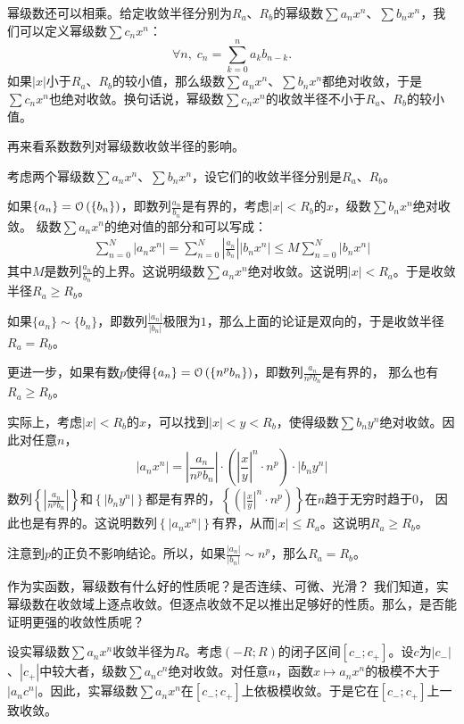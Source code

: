 \documentclass[12pt,UTF8,fontset=none]{ctexbook}
\begin{document}
\begin{appendix}
幂级数还可以相乘。给定收敛半径分别为$R_a$、$R_b$的幂级数$\sum a_n x^n$、$\sum b_n x^n$，我们可以定义幂级数$\sum c_n x^n$：
$$ \forall n, \; c_n = \sum_{k=0}^n a_k b_{n-k}.$$
如果$|x|$小于$R_a$、$R_b$的较小值，那么级数$\sum a_n x^n$、$\sum b_n x^n$都绝对收敛，于是$\sum c_n x^n$也绝对收敛。换句话说，幂级数$\sum c_n x^n$的收敛半径不小于$R_a$、$R_b$的较小值。

再来看系数数列对幂级数收敛半径的影响。

考虑两个幂级数$\sum a_n x^n$、$\sum b_n x^n$，设它们的收敛半径分别是$R_a$、$R_b$。

如果$\{a_n\} = \mathcal{O}\left(\{b_n\}\right)$，即数列$\frac{a_n}{b_n}$是有界的，考虑$|x|<R_b$的$x$，级数$\sum b_n x^n$绝对收敛。
级数$\sum a_n x^n$的绝对值的部分和可以写成：
\begin{align*}
    \sum_{n=0}^{N} |a_n x^n| = \sum_{n=0}^{N} \left|\frac{a_n}{b_n}\right| |b_n x^n| \leqslant M \sum_{n=0}^{N} |b_n x^n|
\end{align*}
其中$M$是数列$\frac{a_n}{b_n}$的上界。这说明级数$\sum a_n x^n$绝对收敛。这说明$|x|<R_a$。于是收敛半径$R_a \geqslant R_b$。

如果$\{a_n\} \sim \{b_n\}$，即数列$\frac{|a_n|}{|b_n|}$极限为$1$，那么上面的论证是双向的，于是收敛半径$R_a = R_b$。

更进一步，如果有数$p$使得$\{a_n\} = \mathcal{O}\left(\{n^p b_n\}\right)$，即数列$\displaystyle\frac{a_n}{n^p  b_n}$是有界的，
那么也有$R_a \geqslant R_b$。

实际上，考虑$|x|<R_b$的$x$，可以找到$|x|<y<R_b$，使得级数$\sum b_n y^n$绝对收敛。因此对任意$n$，
$$ |a_n x^n| = \left|\frac{a_n}{n^p  b_n} \right| \cdot \left(\left| \frac{x}{y}\right|^n \cdot n^p\right) \cdot |b_n y^n| $$
数列$\left\{\left|\frac{a_n}{n^p  b_n} \right|\right\}$和$\left\{|b_n y^n|\right\}$都是有界的，$\left\{\left(\left| \frac{x}{y}\right|^n \cdot n^p\right)\right\}$在$n$趋于无穷时趋于$0$，
因此也是有界的。这说明数列$\left\{|a_n x^n|\right\}$有界，从而$|x|\leqslant R_a$。这说明$R_a\geqslant R_b$。

注意到$p$的正负不影响结论。所以，如果$\frac{|a_n|}{|b_n|} \sim n^p$，那么$R_a = R_b$。

作为实函数，幂级数有什么好的性质呢？是否连续、可微、光滑？
我们知道，实幂级数在收敛域上逐点收敛。但逐点收敛不足以推出足够好的性质。那么，是否能证明更强的收敛性质呢？

设实幂级数$\sum a_n x^n$收敛半径为$R$。考虑$(-R;R)$的闭子区间$[c_-;c_+]$。设$c$为$|c_-|$、$|c_+|$中较大者，级数$\sum a_n c^n$绝对收敛。对任意$n$，函数$x\mapsto a_n x^n$的极模不大于$|a_n c^n|$。因此，实幂级数$\sum a_n x^n$在$[c_-;c_+]$上依极模收敛。于是它在$[c_-;c_+]$上一致收敛。


\end{appendix}
\end{document}
